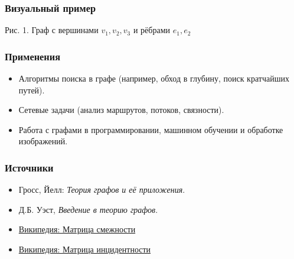 \subsubsection{Визуальный пример}

\begin{center}

\vspace{0.5em}
\small Рис. 1. Граф с вершинами $v_1, v_2, v_3$ и рёбрами $e_1, e_2$
\end{center}

\subsubsection{Применения}

\begin{itemize}[leftmargin=*]
  \item Алгоритмы поиска в графе (например, обход в глубину, поиск кратчайших путей).
  \item Сетевые задачи (анализ маршрутов, потоков, связности).
  \item Работа с графами в программировании, машинном обучении и обработке изображений.
\end{itemize}

\subsubsection{Источники}

\begin{itemize}
  \item Гросс, Йелл: \emph{Теория графов и её приложения}.
  \item Д.Б. Уэст, \emph{Введение в теорию графов}.
  \item \href{https://ru.wikipedia.org/wiki/Матрица_смежности}{Википедия: Матрица смежности}
  \item \href{https://ru.wikipedia.org/wiki/Матрица_инцидентности}{Википедия: Матрица инцидентности}
\end{itemize}